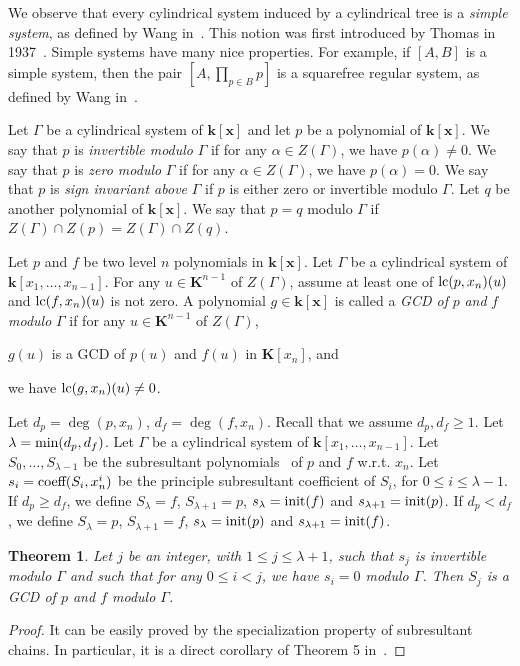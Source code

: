 \documentclass[10pt]{article}
\def\K {\ensuremath{\mathbf{k}}}
\def\KK {\ensuremath{\mathbf{K}}}
\def\x {\ensuremath{\mathbf{x}}}
\newtheorem{Theorem}{Theorem}
\newcommand{\lc}[1]{\mbox{{\rm lc}$(#1)$}}
\newcommand{\init}[1]{\mbox{{\rm init}$(#1)$}}
\newcommand{\coeff}[1]{\mbox{{\rm coeff}$(#1)$}}
\renewcommand{\min}[1]{\mbox{{\rm min}$(#1)$}}
\def\x {\ensuremath{\mathbf{x}}}
\begin{document}
We observe that every cylindrical system induced by a cylindrical tree
is 
a {\em simple system}, as defined by Wang in~\cite{Wang98a}.
This notion was first introduced by Thomas in 1937~\cite{Thomas37}.
Simple systems have many nice properties. For example, 
if $[A,B]$ is a simple system, then 
the pair $[A,\prod_{p\in B} p]$ is a squarefree 
regular system, as defined by Wang in~\cite{Wang98a,Wang00}.

Let $\Gamma$ be a cylindrical system of $\K[\x]$ and
let $p$ be a polynomial of $\K[\x]$.
We say that $p$ is {\em invertible modulo} $\Gamma$ if 
for any $\alpha \in Z(\Gamma)$, we have $p(\alpha) \neq 0$.
We say that $p$ is {\em zero modulo} $\Gamma$ 
if for any $\alpha \in Z(\Gamma)$, we have $p(\alpha)=0$. 
We say that $p$ is {\em sign invariant above} $\Gamma$ if $p$
is either zero or invertible modulo $\Gamma$.
Let $q$ be another polynomial of $\K[\x]$.
We say that $p=q$ modulo $\Gamma$ 
if $Z(\Gamma)\cap Z(p)=Z(\Gamma)\cap Z(q)$.


\smallskip{}
Let $p$ and $f$ be two level $n$ polynomials in $\K[\x]$.
Let $\Gamma$ be a cylindrical system of $\K[x_1,\ldots,x_{n-1}]$.
For any $u\in\KK^{n-1}$ of $Z(\Gamma)$, assume at least one of $\lc{p,x_n}(u)$
and $\lc{f,x_n}(u)$ is not zero.
A polynomial $g \in \K[\x]$ is called a {\em GCD of}
$p$ {\em and} $f$ {\em modulo} $\Gamma$
if for any $u\in\KK^{n-1}$ of $Z(\Gamma)$,
\begin{itemizeshort}
\item $g(u)$ is a GCD of $p(u)$ and $f(u)$ in $\KK[x_n]$, and
\item we have $\lc{g,x_n}(u)\neq 0$.
\end{itemizeshort}
Let $d_p=\deg(p, x_n)$, $d_f=\deg(f, x_n)$.
Recall that we assume $d_p,d_f\geq 1$.
Let $\lambda=\min{d_p, d_f}$.
Let $\Gamma$ be a cylindrical system of $\K[x_1,\ldots,x_{n-1}]$.
Let $S_0,\ldots,S_{\lambda-1}$ be the subresultant polynomials~\cite{Mis93, Ducos00} 
of $p$ and $f$ w.r.t. $x_n$.
Let $s_i=\coeff{S_i, x_n^{i}}$ be the principle
subresultant coefficient of $S_i$, for $0 \leq i \leq \lambda-1 $.
If $d_p\geq d_f$, we define $S_{\lambda}=f$, $S_{\lambda+1}=p$, 
$s_{\lambda}=\init{f}$ and $s_{\lambda+1}=\init{p}$.
If $d_p<d_f$, we define $S_{\lambda}=p$, $S_{\lambda+1}=f$, 
$s_{\lambda}=\init{p}$ and $s_{\lambda+1}=\init{f}$.

\begin{Theorem}
\label{Theorem:gcd}
Let $j$  be an integer, with $1\leq  j \leq \lambda+1$,
such that $s_j$ is invertible modulo $\Gamma$
and such that for any $0\leq i< j$, we have $s_i=0$ modulo $\Gamma$.
Then $S_j$ is a GCD of $p$ and $f$ modulo $\Gamma$.
\end{Theorem}
\begin{proof}
It can be easily proved by the specialization property 
of subresultant chains. 
In particular, it is a direct corollary of 
Theorem 5 in~\cite{CM12}.
\end{proof}
\end{document}
